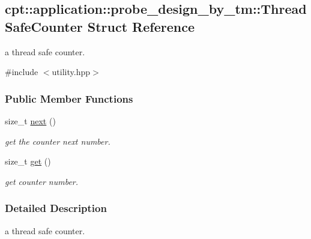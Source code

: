 \hypertarget{structcpt_1_1application_1_1probe__design__by__tm_1_1_thread_safe_counter}{\subsection{cpt\-:\-:application\-:\-:probe\-\_\-design\-\_\-by\-\_\-tm\-:\-:Thread\-Safe\-Counter Struct Reference}
\label{structcpt_1_1application_1_1probe__design__by__tm_1_1_thread_safe_counter}
}


a thread safe counter.  




{\ttfamily \#include $<$utility.\-hpp$>$}

\subsubsection*{Public Member Functions}
\begin{DoxyCompactItemize}
\item 
size\-\_\-t \hyperlink{structcpt_1_1application_1_1probe__design__by__tm_1_1_thread_safe_counter_aacccd7fe9a175c9f7a7eaddae7be820a}{next} ()
\begin{DoxyCompactList}\small\item\em get the counter next number. \end{DoxyCompactList}\item 
size\-\_\-t \hyperlink{structcpt_1_1application_1_1probe__design__by__tm_1_1_thread_safe_counter_a818ed0664faa18b71d338dd11bb2a95f}{get} ()
\begin{DoxyCompactList}\small\item\em get counter number. \end{DoxyCompactList}\end{DoxyCompactItemize}


\subsubsection{Detailed Description}
a thread safe counter. 

